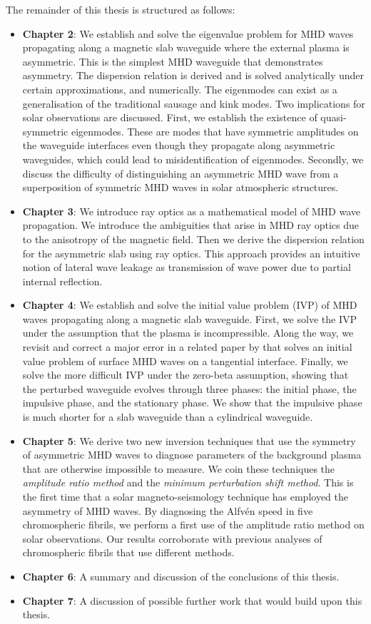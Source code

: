 The remainder of this thesis is structured as follows:
\begin{itemize}
	\item \textbf{Chapter 2}: We establish and solve the eigenvalue problem for MHD waves propagating along a magnetic slab waveguide where the external plasma is asymmetric. This is the simplest MHD waveguide that demonstrates asymmetry. The dispersion relation is derived and is solved analytically under certain approximations, and numerically. The eigenmodes can exist as a generalisation of the traditional sausage and kink modes. Two implications for solar observations are discussed. First, we establish the existence of quasi-symmetric eigenmodes. These are modes that have symmetric amplitudes on the waveguide interfaces even though they propagate along asymmetric waveguides, which could lead to misidentification of eigenmodes. Secondly, we discuss the difficulty of distinguishing an asymmetric MHD wave from a superposition of symmetric MHD waves in solar atmospheric structures.
	\item \textbf{Chapter 3}: We introduce ray optics as a mathematical model of MHD wave propagation. We introduce the ambiguities that arise in MHD ray optics due to the anisotropy of the magnetic field. Then we derive the dispersion relation for the asymmetric slab using ray optics. This approach provides an intuitive notion of lateral wave leakage as transmission of wave power due to partial internal reflection.
	\item \textbf{Chapter 4}: We establish and solve the initial value problem (IVP) of MHD waves propagating along a magnetic slab waveguide. First, we solve the IVP under the assumption that the plasma is incompressible. Along the way, we revisit and correct a major error in a related paper by \cite{rae_etal81} that solves an initial value problem of surface MHD waves on a tangential interface. Finally, we solve the more difficult IVP under the zero-beta assumption, showing that the perturbed waveguide evolves through three phases: the initial phase, the impulsive phase, and the stationary phase. We show that the impulsive phase is much shorter for a slab waveguide than a cylindrical waveguide.
	\item \textbf{Chapter 5}: We derive two new inversion techniques that use the symmetry of asymmetric MHD waves to diagnose parameters of the background plasma that are otherwise impossible to measure. We coin these techniques the \textit{amplitude ratio method} and the \textit{minimum perturbation shift method}. This is the first time that a solar magneto-seismology technique has employed the asymmetry of MHD waves. By diagnosing the Alfv\'{e}n speed in five chromospheric fibrils, we perform a first use of the amplitude ratio method on solar observations. Our results corroborate with previous analyses of chromospheric fibrils that use different methods.
	\item \textbf{Chapter 6}: A summary and discussion of the conclusions of this thesis.
	\item \textbf{Chapter 7}: A discussion of possible further work that would build upon this thesis.
\end{itemize}